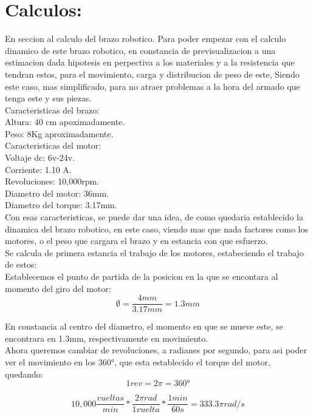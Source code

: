 \documentclass[14pt,a4paper]{article}
\begin{document}
\section{Calculos:}
En seccion al calculo del brazo robotico. Para poder empezar con el calculo dinamico de este brazo robotico, en constancia de previsualizacion a una estimacion dada hipotesis en perpectiva a los materiales y a la resistencia que tendran estos, para el movimiento, carga y distribucion de peso de este, Siendo este caso, mas simplificado, para no atraer problemas a la hora del armado que tenga este y sus piezas.\\

Caracteristicas del brazo:\\
Altura: 40 cm apoximadamente.\\
Peso: 8Kg aproximadamente.\\
Caracteristicas del motor:\\
Voltaje dc: 6v-24v.\\
Corriente: 1.10 A.\\
Revoluciones: 10,000rpm.\\
Diametro del motor: 36mm.\\
Diametro del torque: 3.17mm.\\
Con esas caracteristicas, se puede dar una idea, de como quedaria establecido la dinamica del brazo robotico, en este caso, viendo mas que nada factores como los motores, o el peso que cargara el brazo y en estancia con que esfuerzo.\\
Se calcula de primera estancia el trabajo de los motores, estabeciendo el trabajo de estos:\\

Establecemos el punto de partida de la posicion en la que se encontara al momento del giro del motor:\\

$$ \emptyset=\frac{4mm}{3.17mm}= 1.3mm $$

En constancia al centro del diametro, el momento en que se mueve este, se encontrara en 1.3mm, respectivamente en movimiento.\\
Ahora queremos cambiar de revoluciones, a radianes por segundo, para asi poder ver el movimiento en los 360°, que esta establecido el torque del motor, quedando:\\

$$ 1rev=2\pi=360°$$

$$ 10,000 \frac{vueltas}{min}*\dfrac{2\pi rad}{1 vuelta}*\frac{1 min}{60s}= 333.3 \pi rad/s $$
\end{document}
